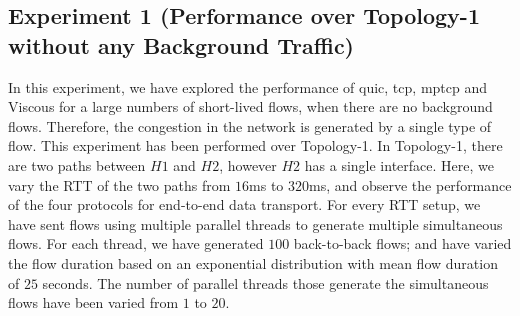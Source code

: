 \subsection{Experiment 1 (Performance over Topology-1 without any Background Traffic)}
\label{sub:experiment1}
In this experiment, we have explored the performance of \acrshort{quic}, \acrshort{tcp}, \acrshort{mptcp} and Viscous for a large numbers of short-lived flows, when there are no background flows. Therefore, the congestion in the network is generated by a single type of flow. This experiment has been performed over Topology-1. In Topology-1, there are two paths between $H1$ and $H2$, however $H2$ has a single interface. Here, we vary the RTT of the two paths from $16$ms to $320$ms, and observe the performance of the four protocols for end-to-end data transport. For every RTT setup, we have sent flows using multiple parallel threads to generate multiple simultaneous flows. For each thread, we have generated $100$ back-to-back flows; and have varied the flow duration based on an exponential distribution with mean flow duration of $25$ seconds. The number of parallel threads those generate the simultaneous flows have been varied from $1$ to $20$.  
%

